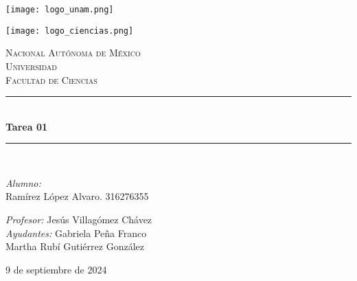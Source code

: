 \begin{center}
    \newcommand{\HRule}{\rule{\linewidth}{0.5mm}}
    \begin{minipage}{0.48\textwidth} 
        \begin{flushleft}
            \texttt{[image: logo\_unam.png]}
        \end{flushleft}
    \end{minipage}
    \begin{minipage}{0.48\textwidth} 
        \begin{flushright}
            \texttt{[image: logo\_ciencias.png]}
        \end{flushright}
    \end{minipage}
    \vspace*{-1.5cm}						
    \textsc{\huge Nacional Autónoma de México \\ \vspace{-4px} Universidad }\\[2cm]	
    \textsc{\LARGE Facultad de Ciencias}\\[1.5cm]
    \vspace*{1cm}					
        \HRule \\[0.7cm]							
            { \huge \bfseries Tarea 01}\\[0.4cm]	
        \HRule \\[1.5cm]						    
    \begin{minipage}{0.52\textwidth}													
        \begin{flushleft} \large	
            \small
            \vspace{-0.6cm}	
            \vspace{-0.6cm}	
                \emph{Alumno:}\\
               Ramírez López Alvaro. 316276355\\
            \vspace*{2cm}
        \end{flushleft}																		
        \end{minipage}		
    \begin{minipage}{0.46\textwidth}		
        \vspace{-0.6cm}											
        \begin{flushright} \large						
            \small										
            \emph{Profesor:} Jesús Villagómez Chávez	\\
            \emph{Ayudantes:}
                Gabriela Peña Franco	 \\
                Martha Rubí Gutiérrez González	 \\
        \end{flushright}																
    \end{minipage}	
    \vspace*{1cm}
    \vspace{2cm}
    \begin{center}						
        {\large 9 de septiembre de 2024}
    \end{center}  						
\end{center}	
\textbf{}
\newpage